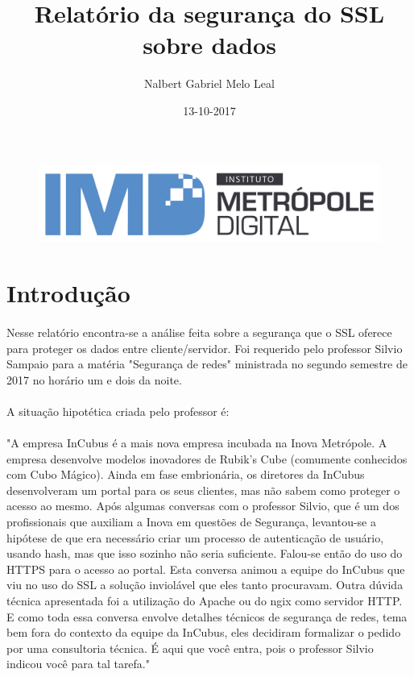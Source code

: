 \documentclass{article}
\title{Relatório da segurança do SSL sobre dados}
\author{Nalbert Gabriel Melo Leal}
\date{13-10-2017}
\begin{document}

  \begin{figure}
		\includegraphics[width=\textwidth]{imdLogo.png}
		\label{fig:imdLogo}
	\end{figure}

  \maketitle

  \newpage

  \tableofcontents
  \newpage


  \section{Introdução}
  \paragraph{}
  Nesse relatório encontra-se a análise feita sobre a segurança que o SSL
  oferece para proteger os dados entre cliente/servidor. Foi requerido pelo
  professor Silvio Sampaio para a matéria "Segurança de redes" ministrada
  no segundo semestre de 2017 no horário um e dois da noite.
  \paragraph{}
  A situação hipotética criada pelo professor é:
  \paragraph{}
  "A empresa InCubus é a mais nova empresa incubada na Inova Metrópole. A empresa desenvolve
modelos inovadores de Rubik's Cube (comumente conhecidos com Cubo Mágico). Ainda em fase
embrionária, os diretores da InCubus desenvolveram um portal para os seus clientes, mas não sabem
como proteger o acesso ao mesmo. Após algumas conversas com o professor Silvio, que é um dos
profissionais que auxiliam a Inova em questões de Segurança, levantou-se a hipótese de que era
necessário criar um processo de autenticação de usuário, usando hash, mas que isso sozinho não
seria suficiente. Falou-se então do uso do HTTPS para o acesso ao portal. Esta conversa animou a
equipe do InCubus que viu no uso do SSL a solução inviolável que eles tanto procuravam. Outra
dúvida técnica apresentada foi a utilização do Apache ou do ngix como servidor HTTP. E como toda
essa conversa envolve detalhes técnicos de segurança de redes, tema bem fora do contexto da equipe
da InCubus, eles decidiram formalizar o pedido por uma consultoria técnica. É aqui que você entra,
pois o professor Silvio indicou você para tal tarefa."
\end{document}
